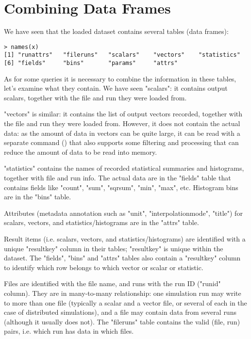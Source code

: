 \section{Combining Data Frames}

We have seen that the loaded dataset contains several tables (data frames):

\begin{verbatim}
> names(x)
[1] "runattrs"   "fileruns"   "scalars"    "vectors"    "statistics"
[6] "fields"     "bins"       "params"     "attrs"
\end{verbatim}

As for some queries it is necessary to combine the information in these tables,
let's examine what they contain. We have seen "scalars": it contains output scalars,
together with the file and run they were loaded from.

"vectors" is similar: it contains the list of output vectors recorded, together
with the file and run they were loaded from. However, it does not contain the
actual data: as the amount of data in vectors can be quite large, it can be read
with a separate command () that also supports some filtering
and processing that can reduce the amount of data to be read into memory.

"statistics" contains the names of recorded statistical summaries and histograms,
together with file and run info. The actual data are in the "fields" table that
contains fields like "count", "sum", "sqrsum", "min", "max", etc. Histogram bins
are in the "bins" table.

Attributes (metadata annotation such as "unit", "interpolationmode", "title") for
scalars, vectors, and statistics/histograms are in the "attrs" table.

Result items (i.e. scalars, vectors, and statistics/histograms) are identified with
a unique "resultkey" column in their tables; "resultkey" is unique within the dataset.
The "fields", "bins" and "attrs" tables also contain a "resultkey" column to
identify which row belongs to which vector or scalar or statistic.

Files are identified with the file name, and runs with the run ID ("runid" column).
They are in many-to-many relationship: one simulation run may write to more than
one file (typically a scalar and a vector file, or several of each in the case of
distributed simulations), and a file may contain data from several runs (although it
usually does not). The "fileruns" table contains the valid (file, run) pairs,
i.e. which run has data in which files.


